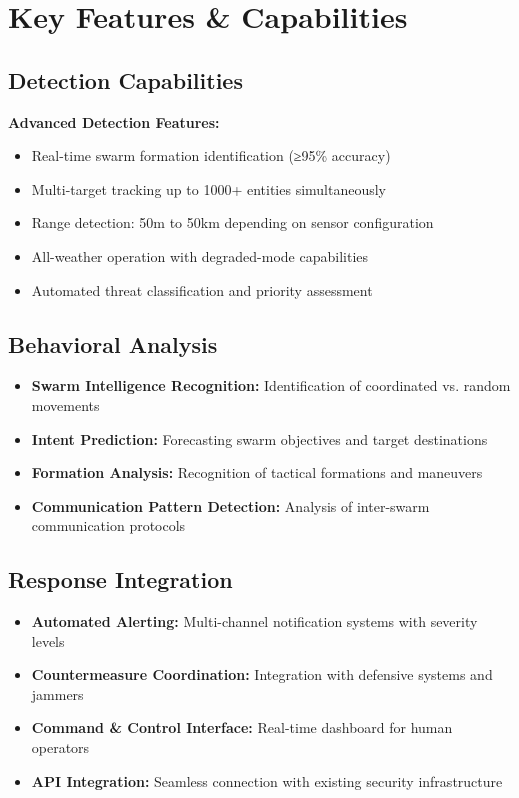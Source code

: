 \documentclass[11pt,a4paper]{article}
\begin{document}
\section{Key Features \& Capabilities}

\subsection{Detection Capabilities}
\begin{success}
\textbf{Advanced Detection Features:}
\begin{itemize}
    \item Real-time swarm formation identification (≥95\% accuracy)
    \item Multi-target tracking up to 1000+ entities simultaneously
    \item Range detection: 50m to 50km depending on sensor configuration
    \item All-weather operation with degraded-mode capabilities
    \item Automated threat classification and priority assessment
\end{itemize}
\end{success}

\subsection{Behavioral Analysis}
\begin{itemize}[leftmargin=2em]
    \item \textbf{Swarm Intelligence Recognition:} Identification of coordinated vs. random movements
    \item \textbf{Intent Prediction:} Forecasting swarm objectives and target destinations
    \item \textbf{Formation Analysis:} Recognition of tactical formations and maneuvers
    \item \textbf{Communication Pattern Detection:} Analysis of inter-swarm communication protocols
\end{itemize}

\subsection{Response Integration}
\begin{itemize}[leftmargin=2em]
    \item \textbf{Automated Alerting:} Multi-channel notification systems with severity levels
    \item \textbf{Countermeasure Coordination:} Integration with defensive systems and jammers
    \item \textbf{Command \& Control Interface:} Real-time dashboard for human operators
    \item \textbf{API Integration:} Seamless connection with existing security infrastructure
\end{itemize}
\end{document}
